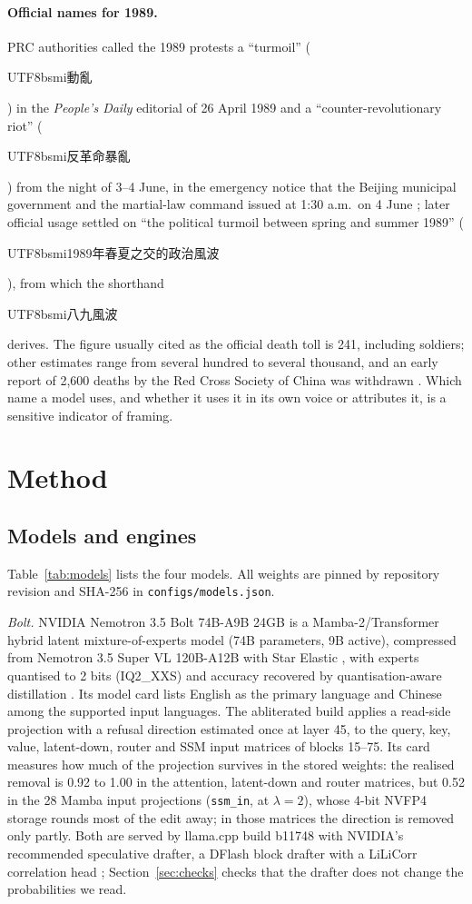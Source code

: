 \documentclass[11pt,a4paper]{article}
\newcommand{\zht}[1]{\begin{CJK}{UTF8}{bsmi}#1\end{CJK}}
\begin{document}
\paragraph{Official names for 1989.}
PRC authorities called the 1989 protests a ``turmoil'' (\zht{動亂}) in the \emph{People's Daily} editorial of 26 April
1989 \citep{pbs2006tankman} and a ``counter-revolutionary riot'' (\zht{反革命暴亂}) from the night of 3--4 June, in the
emergency notice that the Beijing municipal government and the martial-law command issued at 1:30 a.m.\ on 4 June
\citep{xinhua1989notice}; later official usage settled on ``the political turmoil between spring and summer 1989''
(\zht{1989年春夏之交的政治風波}), from which the shorthand \zht{八九風波} derives. The figure usually cited as the
official death toll is 241, including soldiers; other estimates range from several hundred to several thousand, and
an early report of 2,600 deaths by the Red Cross Society of China was withdrawn \citep{pbs2006tankman}. Which name a model uses,
and whether it uses it in its own voice or attributes it, is a sensitive indicator of framing.

\section{Method}

\subsection{Models and engines}\label{sec:models}

Table~\ref{tab:models} lists the four models. All weights are pinned by repository revision and SHA-256 in
\texttt{configs/models.json}.

\emph{Bolt.} NVIDIA Nemotron 3.5 Bolt 74B-A9B 24GB \citep{nvidia2026bolt} is a Mamba-2/Transformer hybrid latent
mixture-of-experts model (74B parameters, 9B active), compressed from Nemotron 3.5 Super VL 120B-A12B with Star Elastic
\citep{taghibakhshi2026star}, with experts quantised to 2 bits (IQ2\_XXS) and accuracy recovered by quantisation-aware
distillation \citep{xin2026qad}. Its model card lists English as the primary language and Chinese among the supported
input languages. The abliterated build \citep{boldingbuilds2026} applies a read-side projection with a refusal
direction estimated once at layer 45, to the query, key, value, latent-down, router and SSM input matrices of blocks
15--75. Its card measures how much of the projection survives in the stored weights: the realised removal is 0.92 to
1.00 in the attention, latent-down and router matrices, but 0.52 in the 28 Mamba input projections
(\texttt{ssm\_in}, at $\lambda = 2$), whose 4-bit NVFP4 storage rounds most of the edit away; in those matrices the
direction is removed only partly. Both are served by llama.cpp \citep{llamacpp} build b11748 with NVIDIA's
recommended speculative drafter, a DFlash block drafter with a LiLiCorr correlation head \citep{rusanovsky2026lilicorr};
Section~\ref{sec:checks} checks that the drafter does not change the probabilities we read.
\end{document}
